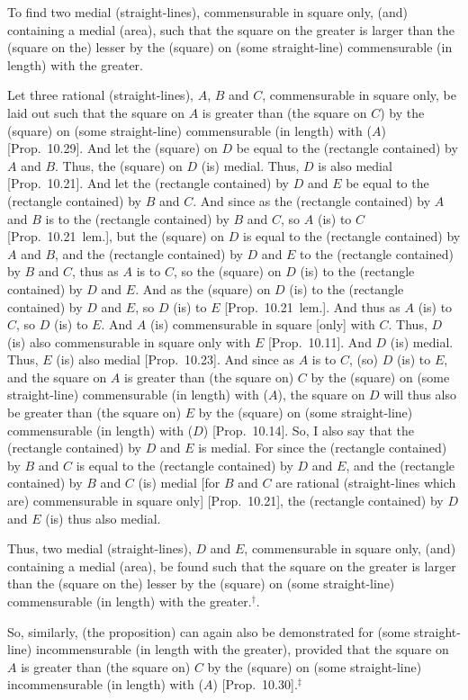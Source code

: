 \begin{Parallel}{}{}
{To find two medial (straight-lines), commensurable in square only, (and) containing a medial (area), such that
the square on the greater is larger than the (square on the) lesser by the
(square) on (some straight-line) commensurable (in length) with the greater.

\epsfysize=0.75in
\centerline{}

Let three rational (straight-lines), $A$, $B$ and $C$, commensurable
in square only, be laid out such that the square on $A$ is greater
than (the square on $C$) by the (square) on (some straight-line)
commensurable (in length) with ($A$) [Prop.~10.29].
And let the (square) on $D$ be equal to the (rectangle contained) by $A$ and
$B$. Thus, the (square) on $D$ (is) medial. Thus, $D$ is also
medial [Prop.~10.21].  And let the 
(rectangle contained) by $D$ and $E$ be equal to the (rectangle contained)
by $B$ and $C$. And since as the (rectangle contained) by $A$ and $B$
is to the (rectangle contained) by $B$ and $C$, so $A$ (is) to $C$
[Prop.~10.21~lem.], but the (square) on $D$
is equal to the (rectangle contained) by $A$ and $B$, and the
(rectangle contained) by $D$ and $E$ to the (rectangle contained) by
$B$ and $C$, thus as $A$ is to $C$, so the (square) on $D$ (is) to
the (rectangle contained) by $D$ and $E$. And as the (square) on $D$
(is) to the (rectangle contained) by $D$ and $E$, so $D$ (is) to $E$ [Prop.~10.21~lem.]. And thus as
$A$ (is) to $C$, so $D$ (is) to $E$. And $A$ (is) commensurable in square
[only] with $C$. Thus, $D$ (is) also commensurable in square only
with $E$ [Prop.~10.11]. And $D$ (is) medial.
Thus, $E$ (is) also medial [Prop.~10.23]. And
since as $A$ is to $C$, (so) $D$ (is) to $E$, and the square on $A$
is greater than (the square on) $C$ by the (square)
on (some straight-line) commensurable (in length) with ($A$),  the square on $D$
will thus also be greater than (the square on) $E$ by the (square) on (some straight-line)
commensurable (in length) with ($D$) [Prop.~10.14].
So, I also say that the (rectangle contained) by $D$ and $E$ is medial.
For since the (rectangle contained) by $B$ and $C$ is equal to the
(rectangle contained) by $D$ and $E$, and the (rectangle contained)
by $B$ and $C$ (is) medial [for $B$ and $C$ are rational
(straight-lines which are) commensurable in square only] [Prop.~10.21], the (rectangle contained) by $D$ and
$E$ (is) thus also medial.

Thus, two medial (straight-lines), $D$ and $E$, commensurable in square only, (and) containing a medial (area), be found such that
the square on the greater is larger than the (square on the) lesser by the
(square) on (some straight-line) commensurable (in length) with the greater.$^\dag$.

So, similarly, (the proposition) can again also be demonstrated for
(some straight-line) incommensurable (in length with the greater), provided that
the square on $A$ is greater than (the square on) $C$ by the (square)
on (some straight-line) incommensurable (in length) with ($A$) [Prop.~10.30].$^\ddag$}
\end{Parallel}
